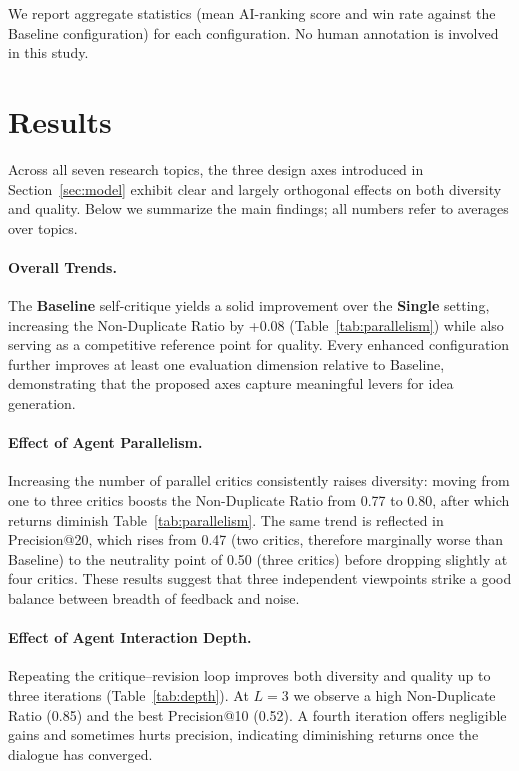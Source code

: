 \documentclass[11pt]{article}
\begin{document}
We report aggregate statistics (mean AI-ranking score and win rate against the Baseline configuration) for each configuration. No human annotation is involved in this study.

\section{Results}

Across all seven research topics, the three design axes introduced in Section~\ref{sec:model} exhibit clear and largely orthogonal effects on both diversity and quality. Below we summarize the main findings; all numbers refer to averages over topics.

\paragraph{Overall Trends.} The \textbf{Baseline} self-critique yields a solid improvement over the \textbf{Single} setting, increasing the Non-Duplicate Ratio by +0.08 (Table~\ref{tab:parallelism}) while also serving as a competitive reference point for quality. Every enhanced configuration further improves at least one evaluation dimension relative to Baseline, demonstrating that the proposed axes capture meaningful levers for idea generation.

\paragraph{Effect of Agent Parallelism.} Increasing the number of parallel critics consistently raises diversity: moving from one to three critics boosts the Non-Duplicate Ratio from 0.77 to 0.80, after which returns diminish Table~\ref{tab:parallelism}. The same trend is reflected in Precision@20, which rises from 0.47 (two critics, therefore marginally worse than Baseline) to the neutrality point of 0.50 (three critics) before dropping slightly at four critics. These results suggest that three independent viewpoints strike a good balance between breadth of feedback and noise.

\paragraph{Effect of Agent Interaction Depth.} Repeating the critique–revision loop improves both diversity and quality up to three iterations (Table~\ref{tab:depth}). At $L{=}3$ we observe a high Non-Duplicate Ratio (0.85) and the best Precision@10 (0.52). A fourth iteration offers negligible gains and sometimes hurts precision, indicating diminishing returns once the dialogue has converged.
\end{document}
